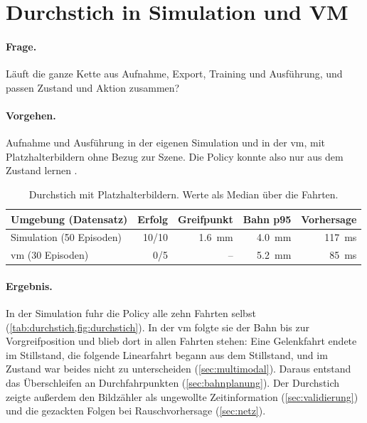 \section{Durchstich in Simulation und VM}
\label{sec:durchstich}

\paragraph{Frage.} Läuft die ganze Kette aus Aufnahme, Export, Training und Ausführung, und
passen Zustand und Aktion zusammen?

\paragraph{Vorgehen.} Aufnahme und Ausführung in der eigenen Simulation und in der \ac{vm}, mit
Platzhalterbildern ohne Bezug zur Szene. Die Policy konnte also nur aus dem Zustand lernen
.

\begin{table}[htbp]
  \centering
  \caption[Durchstich mit Platzhalterbildern]{Durchstich mit Platzhalterbildern. Werte als
  Median über die Fahrten.}
  \label{tab:durchstich}
  \begin{tabularx}{\textwidth}{@{}X r r r r@{}}
    \toprule
    Umgebung (Datensatz) & Erfolg & Greifpunkt & Bahn p95 & Vorhersage \\
    \midrule
    Simulation (50 Episoden) & 10/10 & \SI{1.6}{\milli\metre} & \SI{4.0}{\milli\metre} & \SI{117}{\milli\second} \\
    \acs{vm} (30 Episoden) & 0/5 & -- & \SI{5.2}{\milli\metre} & \SI{85}{\milli\second} \\
    \bottomrule
  \end{tabularx}
\end{table}

\paragraph{Ergebnis.} In der Simulation fuhr die Policy alle zehn Fahrten selbst
(\cref{tab:durchstich,fig:durchstich}). In der \ac{vm} folgte sie der Bahn bis zur
Vorgreifposition und blieb dort in allen Fahrten stehen: Eine Gelenkfahrt endete im Stillstand,
die folgende Linearfahrt begann aus dem Stillstand, und im Zustand war beides nicht zu
unterscheiden (\cref{sec:multimodal}). Daraus entstand das Überschleifen an
Durchfahrpunkten (\cref{sec:bahnplanung}). Der Durchstich zeigte außerdem den Bildzähler als
ungewollte Zeitinformation (\cref{sec:validierung}) und die gezackten Folgen bei
Rauschvorhersage (\cref{sec:netz}).

